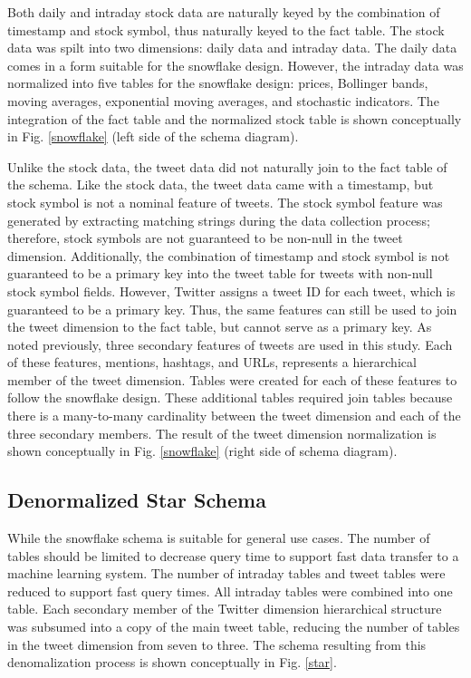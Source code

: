 \documentclass[journal]{IEEEtran}
\begin{document}
Both daily and intraday stock data are naturally keyed by the
 combination of timestamp and stock symbol,
 thus naturally keyed to the fact table.
The stock data was spilt into two dimensions: daily data and intraday data.
The daily data comes in a form suitable for the snowflake design.
However, the intraday data was normalized into five tables for the 
 snowflake design: prices, Bollinger bands, moving averages, exponential
 moving averages, and stochastic indicators.
The integration of the fact table and the normalized stock table is shown
 conceptually in Fig. \ref{snowflake} (left side of the schema diagram).

Unlike the stock data, the tweet data did not naturally join to the fact
 table of the schema.
Like the stock data, the tweet data came with a timestamp, but stock symbol
 is not a nominal feature of tweets.
The stock symbol feature was generated by extracting matching strings
 during the data collection process; therefore, stock symbols are not
 guaranteed to be non-null in the tweet dimension.
Additionally, the combination of timestamp and stock symbol is not guaranteed
 to be a primary key into the tweet table for tweets with non-null stock symbol
 fields.
However, Twitter assigns a tweet ID for each tweet, which is guaranteed to be
 a primary key.
Thus, the same features can still be used to join the tweet dimension to the 
 fact table, but cannot serve as a primary key.
As noted previously, three secondary features of tweets are used in this study.
Each of these features, mentions, hashtags, and URLs, represents a hierarchical
 member of the tweet dimension.
Tables were created for each of these features to follow the snowflake design.
These additional tables required join tables because there is a many-to-many
 cardinality between the tweet dimension and each of the three secondary members.
The result of the tweet dimension normalization is shown conceptually
 in Fig. \ref{snowflake} (right side of schema diagram).

\subsection{Denormalized Star Schema}

While the snowflake schema is suitable for general use cases.
The number of tables should be limited to decrease query time to support
 fast data transfer to a machine learning system.
The number of intraday tables and tweet tables were reduced to support
 fast query times.
All intraday tables were combined into one table. 
Each secondary member of the Twitter dimension hierarchical structure was
 subsumed into a copy of the main tweet table, reducing the number of tables
 in the tweet dimension from seven to three.
The schema resulting from this denomalization process is shown
 conceptually in Fig. \ref{star}.
\end{document}
